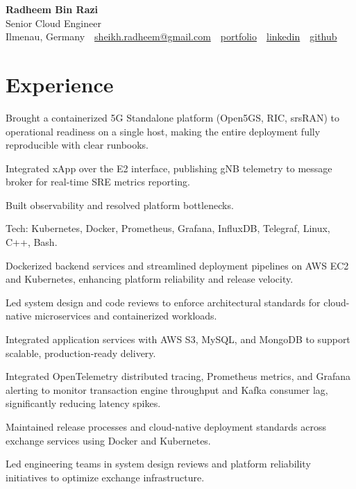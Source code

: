 \documentclass[10pt,a4paper]{resume}
\makeatletter
\newcommand{\Portfolio}{https://radheem.github.io/my-cv}
\newcommand{\PortfolioText}{portfolio}
\newcommand{\GitHub}{https://github.com/radheem}
\newcommand{\LinkedIn}{https://www.linkedin.com/in/radheem-razi}
\newcommand{\Email}{sheikh.radheem@gmail.com}
\makeatother
\begin{document}
\begin{center}
  {\huge\bfseries Radheem Bin Razi}\\[3pt]
  {\large Senior Cloud Engineer}\\[6pt]
  \small
  Ilmenau, Germany \,\textbar\,
  \href{mailto:\Email}{\Email} \,\textbar\,
  \href{\Portfolio}{\PortfolioText} \,\textbar\,
  \href{\LinkedIn}{linkedin} \,\textbar\,
  \href{\GitHub}{github}
\end{center}
\vspace{2pt}

\section{Experience}

\bullets
  \item Brought a containerized 5G Standalone platform (Open5GS, RIC, srsRAN) to operational readiness on a single host, making the entire deployment fully reproducible with clear runbooks.
  \item Integrated xApp over the E2 interface, publishing gNB telemetry to message broker for real-time SRE metrics reporting.
  \item Built observability and resolved platform bottlenecks.
  \item Tech: Kubernetes, Docker, Prometheus, Grafana, InfluxDB, Telegraf, Linux, C++, Bash.
\bulletsend
\vspace{1.5pt}
\bullets
  \item Dockerized backend services and streamlined deployment pipelines on AWS EC2 and Kubernetes, enhancing platform reliability and release velocity.
  \item Led system design and code reviews to enforce architectural standards for cloud-native microservices and containerized workloads.
  \item Integrated application services with AWS S3, MySQL, and MongoDB to support scalable, production-ready delivery.
\bulletsend
\vspace{1.5pt}
\bullets
  \item Integrated OpenTelemetry distributed tracing, Prometheus metrics, and Grafana alerting to monitor transaction engine throughput and Kafka consumer lag, significantly reducing latency spikes.
  \item Maintained release processes and cloud-native deployment standards across exchange services using Docker and Kubernetes.
  \item Led engineering teams in system design reviews and platform reliability initiatives to optimize exchange infrastructure.
\bulletsend
\vspace{1.5pt}
\end{document}
